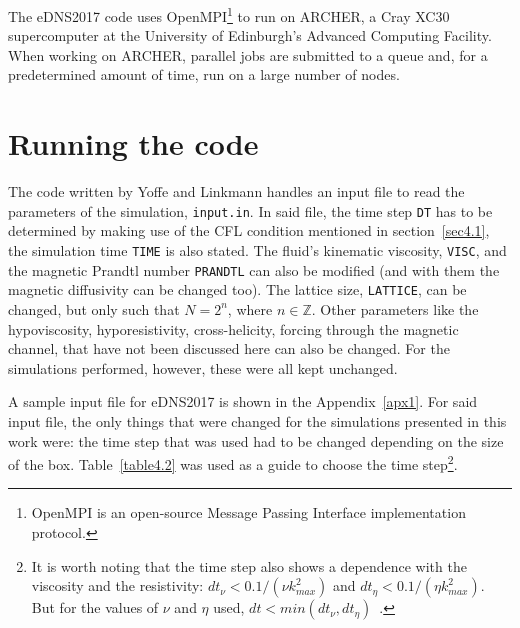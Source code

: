 \documentclass[12pt,a4paper]{report}
\begin{document}
The eDNS2017 code uses OpenMPI\footnote{OpenMPI is an open-source Message Passing Interface implementation protocol.} to run on ARCHER, a Cray XC30 supercomputer at the University of Edinburgh’s Advanced Computing Facility. When working on ARCHER, parallel jobs are submitted to a queue and, for a predetermined amount of time, run on a large number of nodes. %

\section{Running the code}

The code written by Yoffe and Linkmann handles an input file to read the parameters of the simulation, \texttt{input.in}. In said file, the time step \texttt{DT} has to be determined by making use of the CFL condition mentioned in section~\ref{sec4.1}, the simulation time \texttt{TIME} is also stated. The fluid's kinematic viscosity, \texttt{VISC}, and the magnetic Prandtl number \texttt{PRANDTL} can also be modified (and with them the magnetic diffusivity can be changed too). The lattice size, \texttt{LATTICE}, can be changed, but only such that $N=2^n$, where $n \in \mathbb{Z}$. Other parameters like the hypoviscosity, hyporesistivity, cross-helicity, forcing through the magnetic channel, that have not been discussed here can also be changed. For the simulations performed, however, these were all kept unchanged. 

A sample input file for eDNS2017 is shown in the Appendix~\ref{apx1}. For said input file, the only things that were changed for the simulations presented in this work were: the time step that was used had to be changed depending on the size of the box. Table~\ref{table4.2} was used as a guide to choose the time step\footnote{It is worth noting that the time step also shows a dependence with the viscosity and the resistivity: $dt_\nu < 0.1/(\nu k_{max}^2)$ and $dt_\eta < 0.1/(\eta k_{max}^2)$. But for the values of $\nu$ and $\eta$ used, $dt<min(dt_\nu, dt_\eta)$~\cite{yoffe2013investigation}.}.
\end{document}
